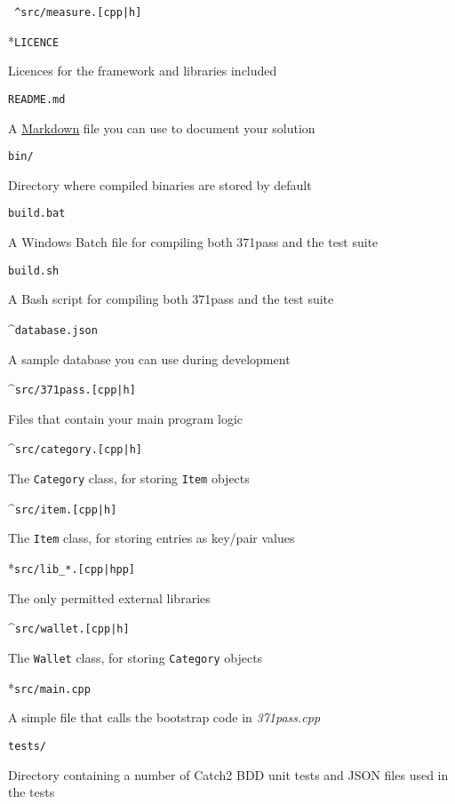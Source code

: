 \documentclass[a4paper]{article}
\begin{document}
\begin{labeling}{\texttt{{\color{blue} \^{}}src/measure.[cpp|h] }}
    \item[{\color{red} *}\texttt{LICENCE}]

    Licences for the framework and libraries included

    \item[\texttt{README.md}]

    A \href{https://commonmark.org}{Markdown} file you can use to document your solution

    \item[\texttt{bin/}]

    Directory where compiled binaries are stored by default

    \item[\texttt{build.bat}]

    A Windows Batch file for compiling both 371pass and the test suite

    \item[\texttt{build.sh}]

    A Bash script for compiling both 371pass and the test suite

    \item[{\color{blue} \^{}}\texttt{database.json}]

    A sample database you can use during development

    \item[{\color{blue} \^{}}\texttt{src/371pass.[cpp|h]}]

    Files that contain your main program logic

    \item[{\color{blue} \^{}}\texttt{src/category.[cpp|h]}]

    The \texttt{Category} class, for storing \texttt{Item} objects
    
    \item[{\color{blue} \^{}}\texttt{src/item.[cpp|h]}]

    The \texttt{Item} class, for storing entries as key/pair values

    \item[{\color{red} *}\texttt{src/lib\_*.[cpp|hpp]}]

    The only permitted external libraries
    
    \item[{\color{blue} \^{}}\texttt{src/wallet.[cpp|h]}]

    The \texttt{Wallet} class, for storing \texttt{Category} objects

    \item[{\color{red} *}\texttt{src/main.cpp}]

    A simple file that calls the bootstrap code in \emph{371pass.cpp}

    \item[\texttt{tests/}]

    Directory containing a number of Catch2 BDD unit tests and JSON files used in the tests
\end{labeling}
\end{document}
